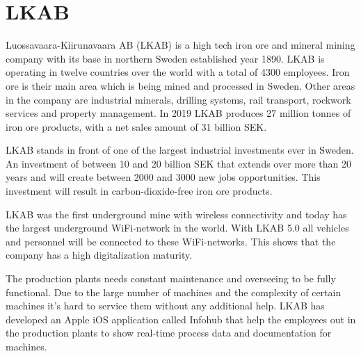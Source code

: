 \section{LKAB}
Luossavaara-Kiirunavaara AB (LKAB) is a high tech iron ore and mineral mining company with its base in northern Sweden established year 1890.
LKAB is operating in twelve countries over the world with a total of 4300 employees.
Iron ore is their main area which is being mined and processed in Sweden.
Other areas in the company are industrial minerals, drilling systems, rail transport, rockwork services and property management.
In 2019 LKAB produces 27 million tonnes of iron ore products, with a net sales amount of 31 billion SEK. \cite{LKABBrief} 

\bigskip

LKAB stands in front of one of the largest industrial investments ever in Sweden.
An investment of between 10 and 20 billion SEK that extends over more than 20 years and will create between 2000 and 3000 new jobs opportunities.
This investment will result in carbon-dioxide-free iron ore products. \cite{LKABInvestment}

\bigskip

LKAB was the first underground mine with wireless connectivity and today has the largest underground WiFi-network in the world.
With LKAB 5.0 all vehicles and personnel will be connected to these WiFi-networks.
This shows that the company has a high digitalization maturity. \cite{LKABITDevelopment}

\bigskip

The production plants needs constant maintenance and overseeing to be fully functional.
Due to the large number of machines and the complexity of certain machines it's hard to service them without any additional help.
LKAB has developed an Apple iOS application called Infohub that help the employees out in the production plants to show real-time process data and documentation for machines.

